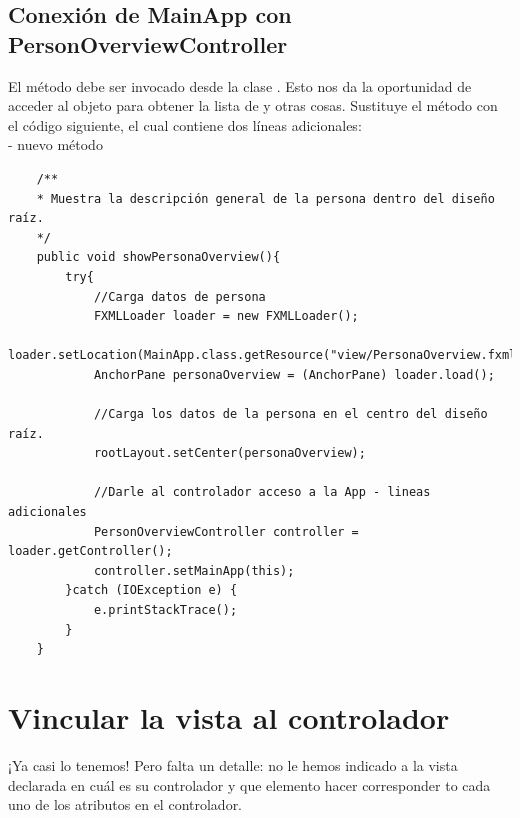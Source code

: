 \subsection{Conexión de MainApp con PersonOverviewController}
El método  debe ser invocado desde la clase . Esto nos da la oportunidad de acceder al objeto  para obtener la lista de  y otras cosas. Sustituye el método  con el código siguiente, el cual contiene dos líneas adicionales:\\
 - nuevo método 
\begin{verbatim}
	/**
	* Muestra la descripción general de la persona dentro del diseño raíz.
	*/
	public void showPersonaOverview(){
		try{
			//Carga datos de persona
			FXMLLoader loader = new FXMLLoader();
			loader.setLocation(MainApp.class.getResource("view/PersonaOverview.fxml"));
			AnchorPane personaOverview = (AnchorPane) loader.load();
			
			//Carga los datos de la persona en el centro del diseño raíz.
			rootLayout.setCenter(personaOverview);
			
			//Darle al controlador acceso a la App - lineas adicionales
			PersonOverviewController controller = loader.getController();
			controller.setMainApp(this);
		}catch (IOException e) {
			e.printStackTrace();
		}
	}
\end{verbatim}

\section{Vincular la vista al controlador}
¡Ya casi lo tenemos! Pero falta un detalle: no le hemos indicado a la vista declarada en  cuál es su controlador y que elemento hacer corresponder to cada uno de los atributos en el controlador.

